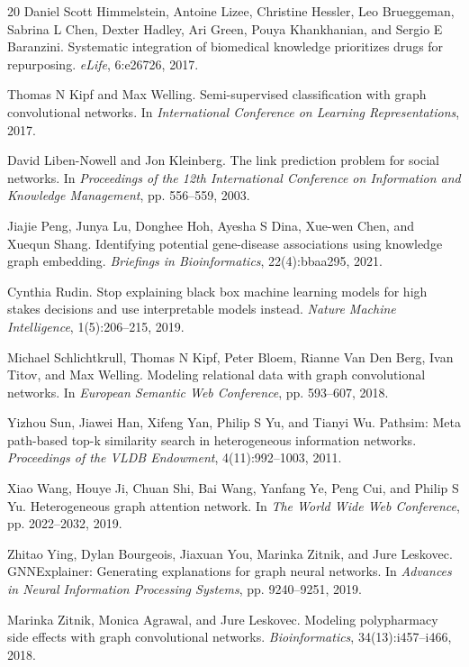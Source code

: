 \documentclass[11pt]{article}
\begin{document}
\begin{thebibliography}{20}
Daniel Scott Himmelstein, Antoine Lizee, Christine Hessler, Leo Brueggeman, Sabrina L Chen, Dexter Hadley, Ari Green, Pouya Khankhanian, and Sergio E Baranzini.
\newblock Systematic integration of biomedical knowledge prioritizes drugs for repurposing.
\newblock \emph{eLife}, 6:e26726, 2017.

Thomas N Kipf and Max Welling.
\newblock Semi-supervised classification with graph convolutional networks.
\newblock In \emph{International Conference on Learning Representations}, 2017.

David Liben-Nowell and Jon Kleinberg.
\newblock The link prediction problem for social networks.
\newblock In \emph{Proceedings of the 12th International Conference on Information and Knowledge Management}, pp. 556--559, 2003.

Jiajie Peng, Junya Lu, Donghee Hoh, Ayesha S Dina, Xue-wen Chen, and Xuequn Shang.
\newblock Identifying potential gene-disease associations using knowledge graph embedding.
\newblock \emph{Briefings in Bioinformatics}, 22(4):bbaa295, 2021.

Cynthia Rudin.
\newblock Stop explaining black box machine learning models for high stakes decisions and use interpretable models instead.
\newblock \emph{Nature Machine Intelligence}, 1(5):206--215, 2019.

Michael Schlichtkrull, Thomas N Kipf, Peter Bloem, Rianne Van Den Berg, Ivan Titov, and Max Welling.
\newblock Modeling relational data with graph convolutional networks.
\newblock In \emph{European Semantic Web Conference}, pp. 593--607, 2018.

Yizhou Sun, Jiawei Han, Xifeng Yan, Philip S Yu, and Tianyi Wu.
\newblock Pathsim: Meta path-based top-k similarity search in heterogeneous information networks.
\newblock \emph{Proceedings of the VLDB Endowment}, 4(11):992--1003, 2011.

Xiao Wang, Houye Ji, Chuan Shi, Bai Wang, Yanfang Ye, Peng Cui, and Philip S Yu.
\newblock Heterogeneous graph attention network.
\newblock In \emph{The World Wide Web Conference}, pp. 2022--2032, 2019.

Zhitao Ying, Dylan Bourgeois, Jiaxuan You, Marinka Zitnik, and Jure Leskovec.
\newblock GNNExplainer: Generating explanations for graph neural networks.
\newblock In \emph{Advances in Neural Information Processing Systems}, pp. 9240--9251, 2019.

Marinka Zitnik, Monica Agrawal, and Jure Leskovec.
\newblock Modeling polypharmacy side effects with graph convolutional networks.
\newblock \emph{Bioinformatics}, 34(13):i457--i466, 2018.

\end{thebibliography}
\end{document}
